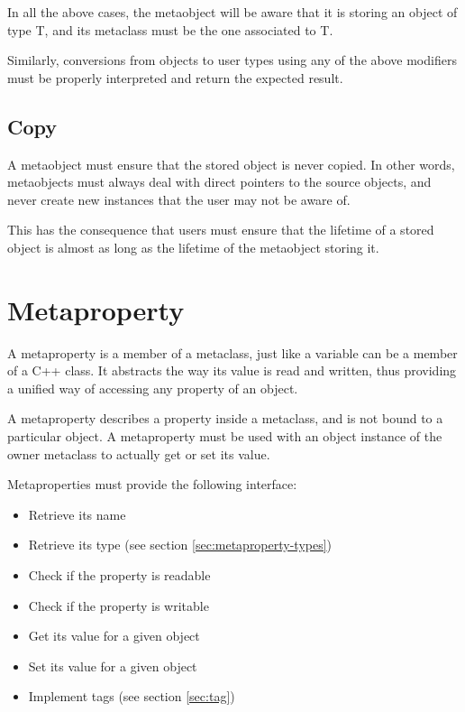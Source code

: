 \documentclass[a4paper, twoside]{report}
\begin{document}
	In all the above cases, the metaobject will be aware that it is storing an object of type T, and its metaclass
	must be the one associated to T.

  Similarly, conversions from objects to user types using any of the above modifiers must be properly interpreted
  and return the expected result.
	
\subsection{Copy}
\label{sec:metaobject-copy}

	A metaobject must ensure that the stored object is never copied. In other words, metaobjects must always
	deal with direct pointers to the source objects, and never create new instances that the user may not be aware of.
	
	This has the consequence that users must ensure that the lifetime of a stored object is almost as long as
	the lifetime of the metaobject storing it.

\section{Metaproperty}
\label{sec:metaproperty}

	A metaproperty is a member of a metaclass, just like a variable can be a member of a C++ class. It abstracts
	the way its value is read and written, thus providing a unified way of accessing any property of an object.

	A metaproperty describes a property inside a metaclass, and is not bound to a particular object. A metaproperty
	must be used with an object instance of the owner metaclass to actually get or set its value.

	Metaproperties must provide the following interface:

	\begin{itemize}
		\item Retrieve its name
		\item Retrieve its type (see section \ref{sec:metaproperty-types})
		\item Check if the property is readable
		\item Check if the property is writable
		\item Get its value for a given object
		\item Set its value for a given object
		\item Implement tags (see section \ref{sec:tag})
	\end{itemize}
\end{document}
